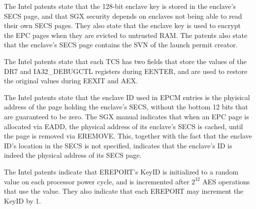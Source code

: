 The Intel patents state that the 128-bit enclave key is stored in the enclave's
SECS page, and that SGX security depends on enclaves not being able to read
their own SECS pages. They also state that the enclave key is used to encrypt
the EPC pages when they are evicted to untrusted RAM. The patents also state
that the enclave's SECS page contains the SVN of the launch permit creator.

The Intel patents state that each TCS has two fields that store the values of
the DR7 and IA32\_DEBUGCTL registers during EENTER, and are used to restore the
original values during EEXIT and AEX.

The Intel patents state that the enclave ID used in EPCM entries is the
phyisical address of the page holding the enclave's SECS, without the bottom
12 bits that are guaranteed to be zero. The SGX manual indicates that when an
EPC page is allocated via EADD, the physical address of its enclave's SECS is
cached, until the page is removed via EREMOVE. This, together with the fact
that the enclave ID's location in the SECS is not specified, indicates that the
enclave's ID is indeed the physical address of its SECS page.


The Intel patents indicate that EREPORT's KeyID is initialized to a random
value on each processor power cycle, and is incremented after $2^{32}$ AES
operations that use the value. They also indicate that each EREPORT may
increment the KeyID by 1.


